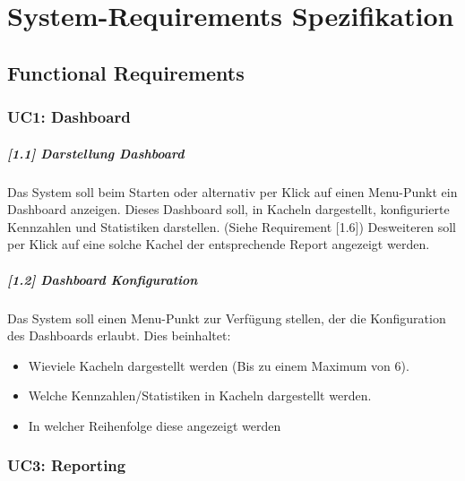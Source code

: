 \documentclass[a4paper]{scrreprt}
\begin{document}
\chapter{System-Requirements Spezifikation}

\section{Functional Requirements}
\subsection{UC1: Dashboard}
\paragraph{[1.1] Darstellung Dashboard}
Das System soll beim Starten oder alternativ per Klick auf einen Menu-Punkt ein Dashboard anzeigen. Dieses Dashboard soll, in Kacheln dargestellt, konfigurierte Kennzahlen und Statistiken darstellen. (Siehe Requirement [1.6]) Desweiteren soll per Klick auf eine solche Kachel der entsprechende Report angezeigt werden. 
 	
\paragraph{[1.2] Dashboard Konfiguration}
Das System soll einen Menu-Punkt zur Verfügung stellen, der die Konfiguration des Dashboards erlaubt. Dies beinhaltet: 
\begin{itemize}
\item Wieviele Kacheln dargestellt werden (Bis zu einem Maximum von 6).
\item Welche Kennzahlen/Statistiken in Kacheln dargestellt werden.
\item In welcher Reihenfolge diese angezeigt werden
\end{itemize}

\subsection{UC3: Reporting}
\end{document}
